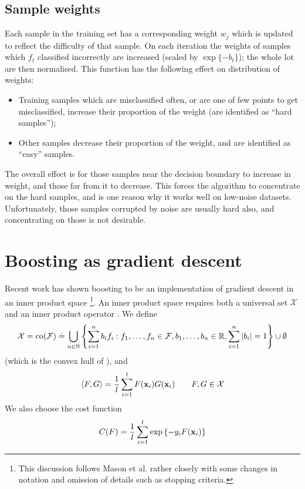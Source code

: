 \subsection{Sample weights}
\label{sec:sample weights}

Each sample in the training set has a corresponding weight $w_j$ which
is updated to reflect the difficulty of that sample.  On each iteration the
weights of samples which $f_t$ classified incorrectly are increased
(scaled by $\exp \{ -b_t \}$); the whole lot are then normalised.
This function has the following effect on distribution of weights:

\begin{itemize}

\item	Training samples which are misclassified often, or are one of 
	few points to get misclassified, increase their proportion of
	the weight (are identified as ``hard samples'');

\item	Other samples decrease their proportion of the weight, and are
	identified as ``easy'' samples.

\end{itemize}

The overall effect is for those samples near the decision boundary to
increase in weight, and those far from it to decrease.  This forces
the algorithm to concentrate on the hard samples, and is one reason
why it works well on low-noise datasets.  Unfortunately, those samples
corrupted by noise are usually hard also, and concentrating on those
is not desirable.


\section{Boosting as gradient descent}
\label{sec:theory:gradient descent}

Recent work has shown boosting to be an implementation of gradient
descent in an inner product space \cite{Mason99}\footnote{This
discussion follows Mason et al. \cite{Mason99} rather closely with
some changes in notation and omission of details such as stopping
criteria.}.
An inner product space requires both a universal set
$\mathcal{X}$ and an inner product operator \ip{\cdot}{\cdot}.  We
define
%
\begin{equation}
\mathcal{X} = 
\mathrm{co} (\mathcal{F}) \doteq
 \bigcup _{n \in \mathbb{N}}
\left\{
 \sum_{i=1}^{n}
  b_i
f_i : f_1, \ldots, f_n \in \mathcal{F},
 b_1, \ldots, b_n \in \mathbb{R},
 \sum_{i=1}^{n} | b_i | = 1
\right\} \cup \emptyset
\end{equation}
%
(which is the convex hull of \calF), and
%
\begin{equation}
\langle {F} , {G} \rangle = \frac{1}{l} \sum_{i=1}^{l} F(\mathbf{x}_i)G(\mathbf{x}_i) \qquad
F, G \in \mathcal{X}
\end{equation}
%
We also choose the cost function
%
\begin{equation}
C(F) = \frac{1}{l} \sum_{i=1}^{l} \exp
\left\{ -y_i F(\mathbf{x}_i) \right\}
\label{eqn:theory:cost function}
\end{equation}

